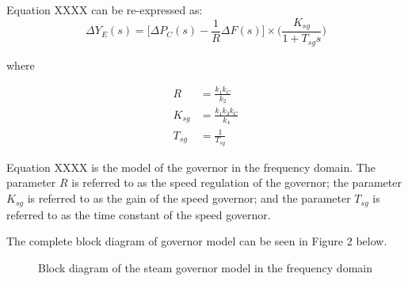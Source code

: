 Equation XXXX can be re-expressed as:
\begin{equation}
	\Delta Y_E(s) = \bigg[ \Delta P_C(s) - \frac{1}{R} \Delta F(s) \bigg] \times \bigg( \frac{K_{sg}}{1 + T_{sg}s} \bigg)
\end{equation}

where

\begin{align}
	R &= \frac{k_1 k_C}{k_2} \\
	K_{sg} &= \frac{k_1 k_3 k_C}{k_4} \\
	T_{sg} &= \frac{1}{T_{sg}} 
\end{align}

Equation XXXX is the model of the governor in the frequency domain. The parameter $R$ is referred to as the speed regulation of the governor; the parameter $K_{sg}$ is referred to as the gain of the speed governor; and the parameter $T_{sg}$ is referred to as the time constant of the speed governor.

The complete block diagram of governor model can be seen in Figure 2 below.

\begin{figure}
	\centering
	
	\caption{Block diagram of the steam governor model in the frequency domain}
	\label{}
\end{figure}